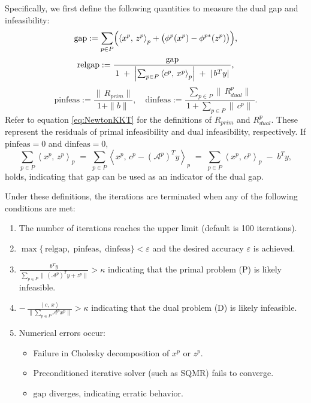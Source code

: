 \documentclass{scrartcl}
\newcommand{\inprod}[2]{\left\langle #1, \, #2 \right\rangle}
\begin{document}
Specifically, we first define the following quantities to measure the dual gap and infeasibility:
\[
  \mathrm{gap}
  := \sum_{p\in P}
       \Bigl(\inprod{x^p}{z^p}_p + \bigl(\phi^p(x^p) - \phi^{p*}(z^p)\bigr)\Bigr),
\]
\[
  \mathrm{relgap}
  := \frac{\mathrm{gap}}
           {\,1 \;+\;\Bigl|\sum_{p\in P}\inprod{c^p}{x^p}_p\Bigr|
                 \;+\;|\,b^T y|\,},
\]
\[
  \mathrm{pinfeas}
  := \frac{\|\,R_{prim}\|}{\,1 + \|b\|\,},
  \quad
  \mathrm{dinfeas}
  := \frac{\sum_{p\in P}\|\,R^p_{dual}\|}
           {\,1 + \sum_{p\in P}\|\,c^p\|\,}.
\]
Refer to equation \eqref{eq:NewtonKKT} for the definitions of $R_{prim}$ and $R_{dual}^p$.
These represent the residuals of primal infeasibility and dual infeasibility, respectively.
If $\mathrm{pinfeas} = 0$ and $\mathrm{dinfeas} = 0$,
\[
  \sum_{p\in P}\inprod{x^p}{z^p}_p 
  \;=\;
  \sum_{p\in P}\inprod{x^p}{c^p - (\mathcal{A}^p)^T y}_p
  \;=\; \sum_{p\in P}\inprod{x^p}{c^p}_p \;-\; b^T y,
\]
holds, indicating that $\mathrm{gap}$ can be used as an indicator of the dual gap.

Under these definitions, the iterations are terminated when any of the following conditions are met:

\begin{enumerate}
    \item The number of iterations reaches the upper limit (default is 100 iterations).
    \item 
      $\displaystyle
      \max\{\,\mathrm{relgap},\;\mathrm{pinfeas},\;\mathrm{dinfeas}\}
      < \varepsilon
      $
      and the desired accuracy $\varepsilon$ is achieved.
    \item 
      $\displaystyle
        \frac{\,b^T y\,}
              {\,\sum_{p\in P}\|\,(\mathcal{A}^p)^T y + z^p\|\!}
      > \kappa
      $
      indicating that the primal problem (P) is likely infeasible.
    \item 
      $\displaystyle
      -\,\frac{\inprod{c}{x}}
              {\bigl\|\sum_{p\in P}\mathcal{A}^p x^p\bigr\|}
      > \kappa
      $
      indicating that the dual problem (D) is likely infeasible.
    \item Numerical errors occur:
      \begin{itemize}
          \item Failure in Cholesky decomposition of $x^p$ or $z^p$.
          \item Preconditioned iterative solver (such as SQMR) fails to converge.
          \item $\mathrm{gap}$ diverges, indicating erratic behavior.
      \end{itemize}
\end{enumerate}
\end{document}
